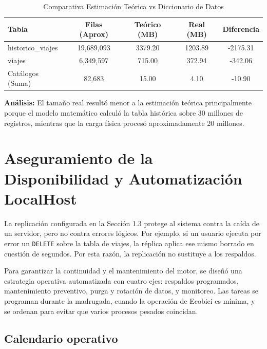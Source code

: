 \documentclass[10pt,a4paper]{article}
\begin{document}
\begin{table}[H]
\centering
\begin{tabular}{|l|c|c|c|c|}
\hline
\textbf{Tabla} & \textbf{Filas (Aprox)} & \textbf{Teórico (MB)} & \textbf{Real (MB)} & \textbf{Diferencia} \\ \hline
historico\_viajes & 19,689,093 & 3379.20 & 1203.89 & -2175.31 \\ \hline
viajes & 6,349,597 & 715.00 & 372.94 & -342.06 \\ \hline
Catálogos (Suma) & 82,683 & 15.00 & 4.10 & -10.90 \\ \hline
\end{tabular}
\caption{Comparativa Estimación Teórica vs Diccionario de Datos}
\end{table}

\textbf{Análisis:} El tamaño real resultó menor a la estimación teórica principalmente porque el modelo matemático calculó la tabla histórica sobre 30 millones de registros, mientras que la carga física procesó aproximadamente 20 millones.


\newpage



\section{Aseguramiento de la Disponibilidad y Automatización LocalHost}

La replicación configurada en la Sección 1.3 protege al sistema contra la caída de un servidor, pero no contra errores lógicos. Por ejemplo, si un usuario ejecuta por error un \texttt{DELETE} sobre la tabla de viajes, la réplica aplica ese mismo borrado en cuestión de segundos. Por esta razón, la replicación no sustituye a los respaldos.

Para garantizar la continuidad y el mantenimiento del motor, se diseñó una estrategia operativa automatizada con cuatro ejes: respaldos programados, mantenimiento preventivo, purga y rotación de datos, y monitoreo. Las tareas se programan durante la madrugada, cuando la operación de Ecobici es mínima, y se ordenan para evitar que varios procesos pesados coincidan.

\subsection{Calendario operativo}
\end{document}
